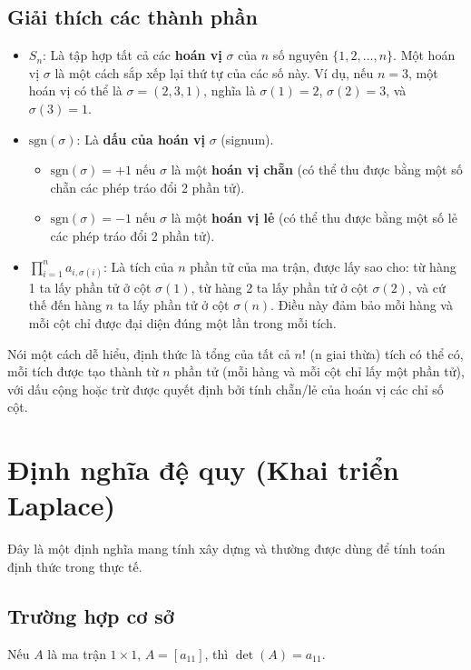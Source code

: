 \subsection*{Giải thích các thành phần}
\begin{itemize}
    \item \textbf{$S_n$}: Là tập hợp tất cả các \textbf{hoán vị} $\sigma$ của $n$ số nguyên $\{1, 2, \dots, n\}$. Một hoán vị $\sigma$ là một cách sắp xếp lại thứ tự của các số này. Ví dụ, nếu $n=3$, một hoán vị có thể là $\sigma = (2, 3, 1)$, nghĩa là $\sigma(1)=2$, $\sigma(2)=3$, và $\sigma(3)=1$.
    
    \item \textbf{$\text{sgn}(\sigma)$}: Là \textbf{dấu của hoán vị} $\sigma$ (signum).
    \begin{itemize}
        \item $\text{sgn}(\sigma) = +1$ nếu $\sigma$ là một \textbf{hoán vị chẵn} (có thể thu được bằng một số chẵn các phép tráo đổi 2 phần tử).
        \item $\text{sgn}(\sigma) = -1$ nếu $\sigma$ là một \textbf{hoán vị lẻ} (có thể thu được bằng một số lẻ các phép tráo đổi 2 phần tử).
    \end{itemize}
    
    \item \textbf{$\prod_{i=1}^{n} a_{i, \sigma(i)}$}: Là tích của $n$ phần tử của ma trận, được lấy sao cho: từ hàng 1 ta lấy phần tử ở cột $\sigma(1)$, từ hàng 2 ta lấy phần tử ở cột $\sigma(2)$, và cứ thế đến hàng $n$ ta lấy phần tử ở cột $\sigma(n)$. Điều này đảm bảo mỗi hàng và mỗi cột chỉ được đại diện đúng một lần trong mỗi tích.
\end{itemize}

Nói một cách dễ hiểu, định thức là tổng của tất cả $n!$ (n giai thừa) tích có thể có, mỗi tích được tạo thành từ $n$ phần tử (mỗi hàng và mỗi cột chỉ lấy một phần tử), với dấu cộng hoặc trừ được quyết định bởi tính chẵn/lẻ của hoán vị các chỉ số cột.

\section{Định nghĩa đệ quy (Khai triển Laplace)}

Đây là một định nghĩa mang tính xây dựng và thường được dùng để tính toán định thức trong thực tế.

\subsection*{Trường hợp cơ sở}
Nếu $A$ là ma trận $1 \times 1$, $A = [a_{11}]$, thì $\det(A) = a_{11}$.

